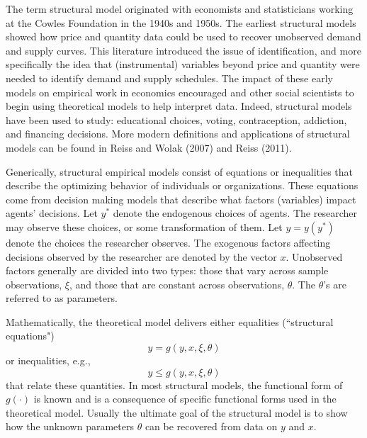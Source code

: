 The term structural model originated with economists and statisticians working at
the Cowles Foundation in the 1940s and 1950s.
The earliest structural models showed how price and quantity data could be used to recover unobserved demand and supply curves. 
This literature
introduced the issue of identification, and more specifically the idea that (instrumental) variables beyond price and quantity were needed to identify demand and supply schedules. 
The impact of these early models on empirical work in economics encouraged and other social scientists to begin using theoretical models to help interpret 
data.
Indeed, structural models have been used to study: educational choices, voting, 
contraception, addiction, and financing decisions. 
More modern definitions and applications 
of structural models can be found in Reiss and Wolak (2007) and Reiss (2011). 

Generically, structural empirical models consist of equations or inequalities that describe the optimizing behavior of individuals or organizations. These equations come from decision making models that describe what factors (variables) impact agents' decisions.
Let $y^*$ denote the endogenous choices of agents. 
The researcher may observe these choices, or some transformation of them.
Let $y=y(y^*)$ denote the choices the researcher observes. 
The exogenous factors affecting decisions observed by the researcher are denoted by the vector $x$. 
Unobserved factors generally
are divided into two types: those that vary across sample observations, $\xi$, and
those that are constant across observations, $\theta$. 
The $\theta$'s are referred to as parameters.

Mathematically, the theoretical model delivers either equalities (``structural equations")
$$  y = g(y, x,\xi ,\theta)$$ 
or inequalities, e.g.,
$$  y \le g(y, x,\xi ,\theta)$$
that relate these quantities. In most structural models, the functional form of $g(\cdot)$ is known
and is a consequence of specific functional forms used in the theoretical model. 
Usually the ultimate goal of the structural model is to show how the unknown parameters 
$\theta$ can be recovered from data on $y$ and $x$. 

